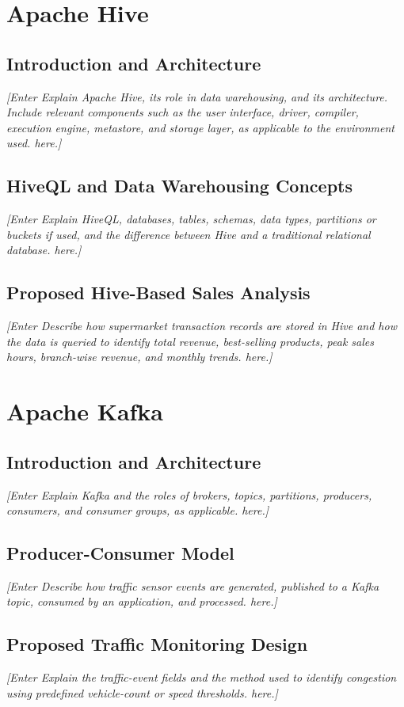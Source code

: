 \documentclass[12pt,a4paper]{report}
\newcommand{\placeholder}[1]{\textit{[Enter #1 here.]}}
\begin{document}
\section{Apache Hive}
\subsection{Introduction and Architecture}
\placeholder{Explain Apache Hive, its role in data warehousing, and its
architecture. Include relevant components such as the user interface,
driver, compiler, execution engine, metastore, and storage layer, as
applicable to the environment used.}

\subsection{HiveQL and Data Warehousing Concepts}
\placeholder{Explain HiveQL, databases, tables, schemas, data types,
partitions or buckets if used, and the difference between Hive and a
traditional relational database.}

\subsection{Proposed Hive-Based Sales Analysis}
\placeholder{Describe how supermarket transaction records are stored in
Hive and how the data is queried to identify total revenue, best-selling
products, peak sales hours, branch-wise revenue, and monthly trends.}

\section{Apache Kafka}
\subsection{Introduction and Architecture}
\placeholder{Explain Kafka and the roles of brokers, topics, partitions,
producers, consumers, and consumer groups, as applicable.}

\subsection{Producer-Consumer Model}
\placeholder{Describe how traffic sensor events are generated, published
to a Kafka topic, consumed by an application, and processed.}

\subsection{Proposed Traffic Monitoring Design}
\placeholder{Explain the traffic-event fields and the method used to
identify congestion using predefined vehicle-count or speed thresholds.}
\end{document}
